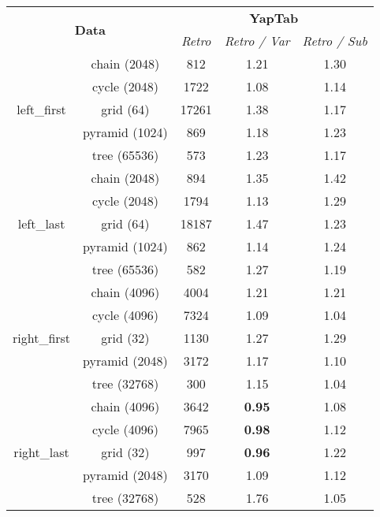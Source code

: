 \begin{table}[ht]
\centering
\small{
  \begin{tabular}{cc|ccc}
   \hline
    \hline
    \multicolumn{2}{c|}{\multirow{2}{*}{\normalsize{\textbf{Data}}}} & \multicolumn{3}{c}{\normalsize{\textbf{YapTab}}} \\
    \multicolumn{2}{c|}{} & \small{\textit{Retro}} & \textit{\small{Retro / Var}} & \textit{\small{Retro / Sub}} \\
   \hline
   \hline
   
   \multirow{5}{*}{left\_first} &  \footnotesize{chain (2048)} & 812 &  1.21  &  1.30 \\
   &  \footnotesize{cycle (2048)} & 1722 &  1.08  &  1.14 \\
   &  \footnotesize{grid (64)} & 17261 &  1.38  &  1.17 \\
   &  \footnotesize{pyramid (1024)} & 869 &  1.18  &  1.23 \\
   &  \footnotesize{tree (65536)} & 573 &  1.23  &  1.17 \\
   \hline
   \multirow{5}{*}{left\_last} &  \footnotesize{chain (2048)} & 894 &  1.35  &  1.42 \\
   &  \footnotesize{cycle (2048)} & 1794 &  1.13  &  1.29 \\
   &  \footnotesize{grid (64)} & 18187 &  1.47  &  1.23 \\
   &  \footnotesize{pyramid (1024)} & 862 &  1.14  &  1.24 \\
   &  \footnotesize{tree (65536)} & 582 &  1.27  &  1.19 \\
   \hline

   \multirow{5}{*}{right\_first} &  \footnotesize{chain (4096)} & 4004 &  1.21  &  1.21 \\
   &  \footnotesize{cycle (4096)} & 7324 &  1.09  &  1.04 \\
   &  \footnotesize{grid (32)} & 1130 &  1.27  &  1.29 \\
   &  \footnotesize{pyramid (2048)} & 3172 &  1.17  &  1.10 \\
   &  \footnotesize{tree (32768)} & 300 &  1.15  &  1.04 \\
   \hline
   \multirow{5}{*}{right\_last} &  \footnotesize{chain (4096)} & 3642 &  \textbf{0.95}  &  1.08 \\
   &  \footnotesize{cycle (4096)} & 7965 &  \textbf{0.98}  &  1.12 \\
   &  \footnotesize{grid (32)} & 997 &  \textbf{0.96}  &  1.22 \\
   &  \footnotesize{pyramid (2048)} & 3170 &  1.09  &  1.12 \\
   &  \footnotesize{tree (32768)} & 528 &  1.76  &  1.05 \\
   \hline


\end{tabular}}
\end{table}
